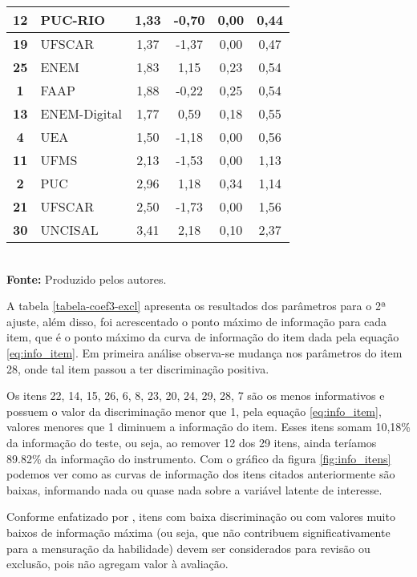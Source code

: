 \begin{table}[h]
\begin{tabular}{clcccc}
		\hline \textbf{12} & PUC-RIO & 1,33 & -0,70 & 0,00 & 0,44 \\ 
		\hline \textbf{19} & UFSCAR & 1,37 & -1,37 & 0,00 & 0,47 \\ 
		\hline \textbf{25} & ENEM & 1,83 & 1,15 & 0,23 & 0,54 \\ 
		\hline \textbf{1 }& FAAP & 1,88 & -0,22 & 0,25 & 0,54 \\ 
		\hline \textbf{13} & ENEM-Digital & 1,77 & 0,59 & 0,18 & 0,55 \\ 
		\hline \textbf{4 }& UEA & 1,50 & -1,18 & 0,00 & 0,56 \\ 
		\hline \textbf{11} & UFMS & 2,13 & -1,53 & 0,00 & 1,13 \\ 
		\hline \textbf{2 }& PUC & 2,96 & 1,18 & 0,34 & 1,14 \\ 
		\hline \textbf{21} & UFSCAR & 2,50 & -1,73 & 0,00 & 1,56 \\ 
		\hline \textbf{30} & UNCISAL & 3,41 & 2,18 & 0,10 & 2,37 \\
		\hline
	\end{tabular}\\
	\vspace*{0.5cm}
	\small{\textbf{Fonte:} Produzido pelos autores.}
\end{table}

A tabela \ref{tabela-coef3-excl} apresenta os resultados dos parâmetros para o 2ª ajuste, além disso, foi acrescentado o ponto máximo de informação para cada item, que é o ponto máximo da curva de informação do item  dada pela equação \ref{eq:info_item}. Em primeira análise observa-se mudança nos parâmetros do item 28, onde tal item passou a ter discriminação positiva. 

Os itens 22, 14, 15, 26, 6, 8, 23, 20, 24, 29, 28, 7 são os menos informativos e  possuem o valor da discriminação menor que 1, pela equação \ref{eq:info_item}, valores menores que 1 diminuem a informação do item. Esses itens somam 10,18\% da informação do teste, ou seja, ao remover 12 dos 29 itens, ainda teríamos  89.82\% da informação do instrumento. Com o gráfico da figura \ref{fig:info_itens} podemos ver como as curvas de informação dos itens citados anteriormente são baixas, informando nada ou quase nada sobre a variável latente de interesse.

Conforme enfatizado por , itens com baixa discriminação ou com valores muito baixos de informação máxima (ou seja, que não contribuem significativamente para a mensuração da habilidade) devem ser considerados para revisão ou exclusão, pois não agregam valor à avaliação.

